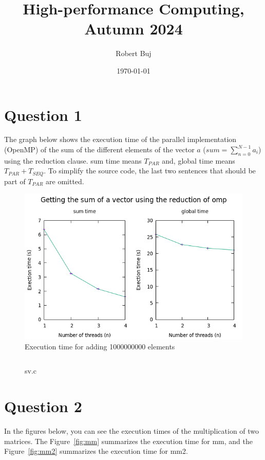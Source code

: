\documentclass[12pt]{article}
\title{High-performance Computing, Autumn 2024}
\author{Robert Buj}
\date{\today}
\begin{document}
\maketitle

\section*{Question 1}

The graph below shows the execution time of the parallel implementation (OpenMP) of the sum of the different elements of the vector $a$ ($sum = \sum_{n=0}^{N-1} a_i$) using the reduction clause. sum time means $T_{PAR}$ and, global time means $T_{PAR}+T_{SEQ}$. To simplify the source code, the last two sentences that should be part of $T_{PAR}$ are omitted.

\begin{figure}[h!]
	\centering
	\includegraphics[width=0.8\linewidth]{sv.png}
	\caption{Execution time for adding 1000000000 elements}
	\label{fig:reduction}
\end{figure}

\newpage

\begin{figure}[h!]
	\inputminted{c}{sv.c}
	\caption{sv.c}\label{code:sv}
\end{figure}

\newpage

\section*{Question 2}

In the figures below, you can see the execution times of the multiplication of two matrices. The Figure~\ref{fig:mm} summarizes the execution time for mm, and the Figure~\ref{fig:mm2} summarizes the execution time for mm2.
\end{document}

